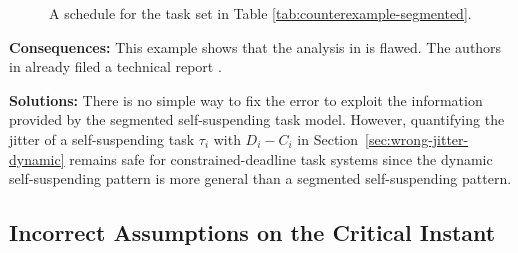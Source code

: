 \begin{figure}[t]
{}       
\caption{A schedule for the task set in Table  \ref{tab:counterexample-segmented}. }
\label{fig:counterexample-segmented}
\end{figure}


{\bf Consequences:} This example shows that the analysis in \cite{RTCSA-BletsasA05} is flawed.  The authors in \cite{RTCSA-BletsasA05}  already filed a technical report \cite{BletsasReport2015}.

{\bf Solutions:} There is no simple way to fix the error to exploit the information provided by the segmented self-suspending task model. However, quantifying the jitter of a self-suspending task $\tau_i$ with $D_i-C_i$ in Section~\ref{sec:wrong-jitter-dynamic}  remains safe for constrained-deadline task systems since the dynamic self-suspending pattern is more general than a segmented self-suspending pattern.

\subsection{Incorrect Assumptions on the Critical Instant}
\label{sec:wrong-critical}

